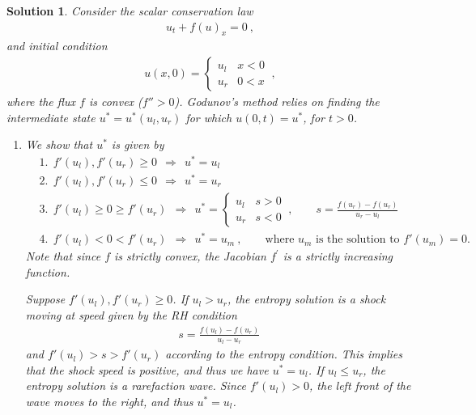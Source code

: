 \documentclass[10pt,letterpaper]{article}
\newcommand{\frb}[1]{ \left(  {#1} \right) }
\theoremstyle{break}
\newtheorem{mysolution}{Solution}
\newenvironment{solution}{\begin{mysolution}}{\end{mysolution}}
\begin{document}
\begin{solution}
    Consider the scalar conservation law
    \begin{gather}
        u_t+f(u)_x=0\ ,
    \end{gather}
    and initial condition
    \begin{align}
        u(x,0)=\begin{cases}
            u_l & x<0\\
            u_r & 0<x
        \end{cases}\ ,
    \end{align}
    where the flux $f$ is convex ($f''>0$).
    Godunov's method relies on finding the intermediate state $u^*=u^*(u_l,u_r)$ for which $u(0,t)=u^*$, for $t>0$.
    \begin{enumerate}
        \item
        We show that $u^*$ is given by
        \begin{align*}
            &1.\ \ f'(u_l), f'(u_r)\ge 0 \ \ \Longrightarrow \ \ u^*=u_l \\
            &2.\ \ f'(u_l), f'(u_r)\le 0 \ \ \Longrightarrow \ \ u^*=u_r \\[0.5em]
            &3.\ \ f'(u_l) \ge 0\ge f'(u_r) \ \ \Longrightarrow \ \
                u^*=\begin{cases}
                    u_l & s>0 \\
                    u_r & s<0
                \end{cases}\ ,
                \qquad s=\frac{f(u_r)-f(u_r)}{u_r-u_l}\\[0.5em]
            &4.\ \ f'(u_l) < 0 < f'(u_r)  \ \ \Longrightarrow \ \ u^*=u_m\ ,
                \qquad\text{where $u_m$ is the solution to $f'\frb{u_m}=0$.}
        \end{align*}
        Note that since $f$ is strictly convex, the Jacobian $f^\prime$ is a strictly increasing function.

        Suppose $f'(u_l), f'(u_r)\ge 0$.
        If $u_l>u_r$, the entropy solution is a shock moving at speed given by the RH condition
        \begin{gather} \label{RHJumpCond}
            s=\frac{f(u_l)-f(u_r)}{u_l-u_r}\,
        \end{gather}
        and $f'(u_l) > s > f'(u_r)$ according to the entropy condition.
        This implies that the shock speed is positive, and thus we have $u^*=u_l$. 
        If $u_l\le u_r$, the entropy solution is a rarefaction wave.
        Since $f'(u_l)>0$, the left front of the wave moves to the right, and thus $u^*=u_l$.


\end{enumerate}
\end{solution}
\end{document}
